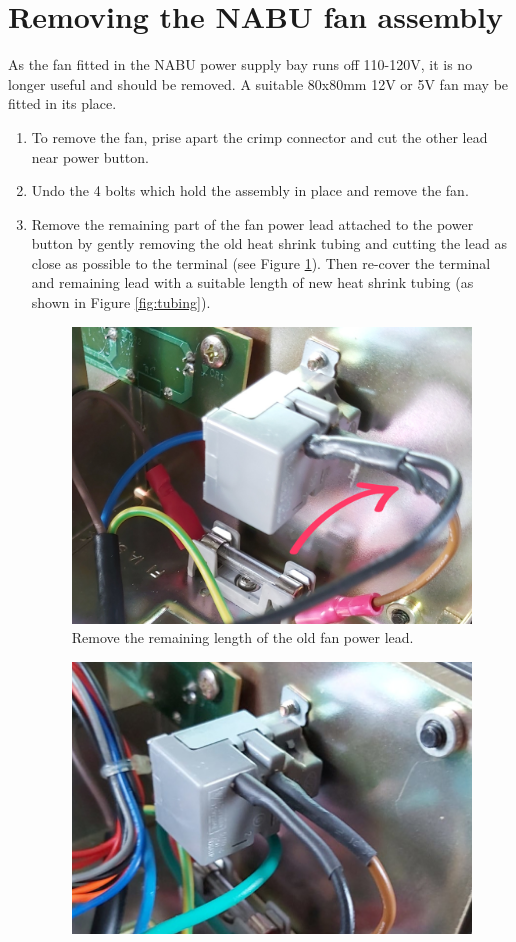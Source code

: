 \documentclass[twocolumn]{report}
\begin{document}
\section{Removing the NABU fan assembly}
As the fan fitted in the NABU power supply bay runs off 110-120V, it is no longer useful and should be removed. A suitable 80x80mm 12V or 5V fan may be fitted in its place.
\begin{enumerate}
	\item  To remove the fan, prise apart the crimp connector and cut the other lead near power button.
	\item Undo the 4 bolts which hold the assembly in place and remove the fan.
	\item Remove the remaining part of the fan power lead attached to the power button by gently removing the old heat shrink tubing and cutting the lead as close as possible to the terminal (see Figure \ref{fig:fan}). Then re-cover the terminal and remaining lead with a suitable length of new heat shrink tubing (as shown in Figure \ref{fig:tubing}).
	\begin{figure}[h!]
		\includegraphics[width=\columnwidth]{images/psu-image-1a.jpg}
		\caption{Remove the remaining length of the old fan power lead.}
		\label{fig:fan}
	\end{figure}
	\begin{figure}[h!]
		\includegraphics[width=\columnwidth]{images/psu-image-1b.jpg}

\end{figure}
\end{enumerate}
\end{document}
